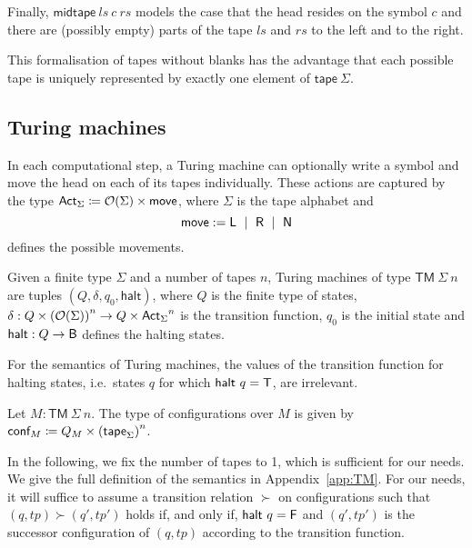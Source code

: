 Finally, $\textsf{midtape}~ls~c~rs$ models the case that the head resides on the symbol $c$ and there are (possibly empty) parts of the tape $ls$ and $rs$ to the left and to the right.

This formalisation of tapes without blanks has the advantage that each possible tape is uniquely represented by exactly one element of $\textsf{tape}~\Sigma$. 

\subsection{Turing machines}
In each computational step, a Turing machine can optionally write a symbol and move the head on each of its tapes individually. These actions are captured by the type $\textsf{Act}_{\Sigma} \coloneqq{} \mathcal{O}{(\Sigma)} \times \textsf{move}$, where $\Sigma$ is the tape alphabet and 
\[\textsf{move} := \textsf{L} ~\mid~ \textsf{R} ~\mid~ \textsf{N} \] 
defines the possible movements. 

\begin{definition}
  Given a finite type $\Sigma$ and a number of tapes $n$, Turing machines of type $\textsf{TM}~\Sigma~n$ are tuples $(Q, \delta, q_0, \textsf{halt})$, where $Q$ is the finite type of states, $\delta : Q \times {(\mathcal{O}{(\Sigma)})}^n \rightarrow Q \times {\textsf{Act}_\Sigma}^n$ is the transition function, $q_0$ is the initial state and $\textsf{halt} : Q \rightarrow \textsf{B}$ defines the halting states.
\end{definition}
For the semantics of Turing machines, the values of the transition function for halting states, i.e.\ states $q$ for which $\textsf{halt}~q = \mathsf{T}$, are irrelevant. 

\begin{definition}[Configurations]
  Let $M : \textsf{TM}~\Sigma~n$. The type of configurations over $M$ is given by 
  $\textsf{conf}_{M} \coloneqq Q_{M} \times {(\textsf{tape}_{\Sigma})}^n$.
\end{definition}

In the following, we fix the number of tapes to 1, which is sufficient for our needs. 
We give the full definition of the semantics in Appendix~\ref{app:TM}.
For our needs, it will suffice to assume a transition relation $\succ$ on configurations such that 
$(q, tp) \succ (q', tp')$ holds if, and only if, $\textsf{halt}~q = \mathsf{F}$ and $(q', tp')$ is the successor configuration of $(q, tp)$ according to the transition function.


